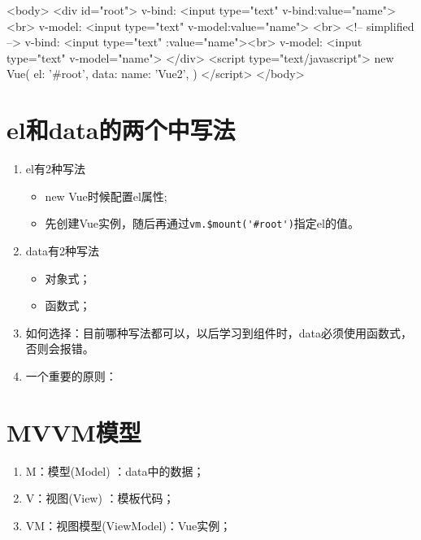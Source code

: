 \begin{html}
    <body>
    <div id="root">
    v-bind: <input type="text" v-bind:value="name"><br>
    v-model: <input type="text" v-model:value="name">
    <br>
    <!-- simplified -->
    v-bind: <input type="text" :value="name"><br>
    v-model: <input type="text" v-model="name">
    </div>
    <script type="text/javascript">
    new Vue({
    el: '#root',
    data: {
    name: 'Vue2',
    }
    })
    </script>
    </body>
\end{html}
\section{el和data的两个中写法}
\begin{enumerate}
    \item el有2种写法
          \begin{itemize}
              \item new Vue时候配置el属性;
              \item 先创建Vue实例，随后再通过\verb|vm.$mount('#root')|指定el的值。
          \end{itemize}
    \item data有2种写法
          \begin{itemize}
              \item 对象式；
              \item 函数式；
          \end{itemize}
    \item 如何选择：目前哪种写法都可以，以后学习到组件时，data必须使用函数式，否则会报错。
    \item 一个重要的原则：
\end{enumerate}
\section{MVVM模型}
\begin{enumerate}
    \item M：模型(Model) ：data中的数据；
    \item V：视图(View) ：模板代码；
    \item VM：视图模型(ViewModel)：Vue实例；
\end{enumerate}

